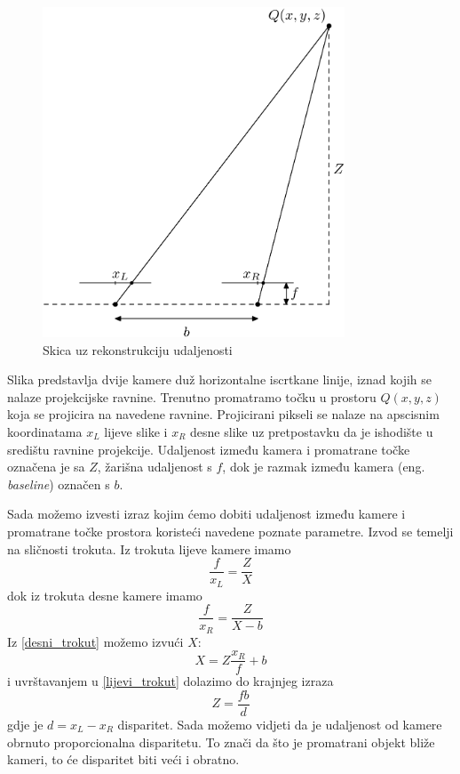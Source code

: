\documentclass[utf8, zavrsni, numeric]{fer}
\begin{document}
\begin{figure}[htb]
  \centering
  \includegraphics[width=9cm]{img/rekonstrukcija_udaljenosti.png}
  \caption{Skica uz rekonstrukciju udaljenosti}
  \label{fig:rekonstrukcija_udaljenosti}
\end{figure}

Slika predstavlja dvije kamere duž horizontalne iscrtkane linije, iznad kojih se
nalaze projekcijske ravnine. Trenutno promatramo točku u prostoru $Q(x, y, z)$ koja se projicira na navedene ravnine.
Projicirani pikseli se nalaze na apscisnim koordinatama $x_L$ lijeve slike i
$x_R$ desne slike uz pretpostavku da je ishodište u središtu ravnine projekcije. Udaljenost između kamera i promatrane točke označena je sa $Z$, žarišna
udaljenost s $f$, dok je razmak između kamera (eng. {\sl baseline}) označen s $b$.

Sada možemo izvesti izraz kojim ćemo dobiti udaljenost između kamere i promatrane točke prostora
koristeći navedene poznate parametre. Izvod se temelji na sličnosti trokuta. Iz trokuta lijeve kamere imamo
\begin{equation}
\frac{f}{x_L} = \frac{Z}{X} \label{lijevi_trokut}
\end{equation}
dok iz trokuta desne kamere imamo
\begin{equation}
\frac{f}{x_R} = \frac{Z}{X - b} \label{desni_trokut}
\end{equation}
Iz \ref{desni_trokut} možemo izvući $X$:
\begin{equation}
X = Z\frac{x_R}{f} + b \label{desni_x}
\end{equation}
i uvrštavanjem u \ref{lijevi_trokut} dolazimo do krajnjeg izraza
\begin{equation}
Z = \frac{fb}{d} \label{udaljenost}
\end{equation}
gdje je $d = x_L - x_R$ disparitet.
Sada možemo vidjeti da je udaljenost od kamere obrnuto proporcionalna disparitetu. To znači da što
je promatrani objekt bliže kameri, to će disparitet biti veći i obratno.
\end{document}

